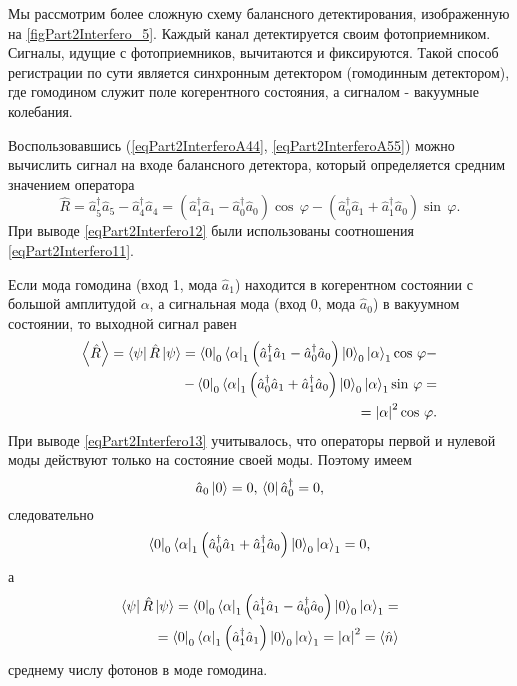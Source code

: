 

Мы рассмотрим более сложную схему балансного детектирования,
изображенную на \autoref{figPart2Interfero_5}. Каждый канал
детектируется своим фотоприемником. Сигналы, идущие с фотоприемников, 
вычитаются и фиксируются. Такой способ регистрации по сути является
синхронным детектором (гомодинным детектором), где гомодином служит
поле когерентного состояния, а сигналом - вакуумные колебания.

Воспользовавшись (\ref{eqPart2InterferoA44},
\ref{eqPart2InterferoA55}) можно вычислить
сигнал на входе балансного детектора, который определяется средним значением
оператора  
\begin{equation}
\hat{R} = 
\hat{a}_5^{\dag} \hat{a}_5 - 
\hat{a}_4^{\dag} \hat{a}_4 =
\left(
\hat{a}_1^{\dag} \hat{a}_1 - 
\hat{a}_0^{\dag} \hat{a}_0
\right) \cos\,\varphi -
\left(
\hat{a}_0^{\dag} \hat{a}_1 + 
\hat{a}_1^{\dag} \hat{a}_0
\right) \sin\,\varphi.
\label{eqPart2Interfero12}
\end{equation}
При выводе \eqref{eqPart2Interfero12} были использованы соотношения
\eqref{eqPart2Interfero11}.

Если мода гомодина (вход 1, мода $\hat{a}_1$) находится в
когерентном состоянии с большой амплитудой $\alpha$, а сигнальная мода
(вход 0, мода $\hat{a}_0$) в вакуумном состоянии, то выходной сигнал
равен
\begin{eqnarray}
\left<\hat{R}\right> = 
\left<\psi\right|\hat{R} \left|\psi\right> = 
\bra{0}_0\left<\alpha\right|_1
\left(
\hat{a}_1^{\dag} \hat{a}_1 - 
\hat{a}_0^{\dag} \hat{a}_0
\right)
\ket{0}_0\left|\alpha\right>_1
\cos\,\varphi
-
\nonumber \\
-
\bra{0}_0\left<\alpha\right|_1
\left(
\hat{a}_0^{\dag} \hat{a}_1 + 
\hat{a}_1^{\dag} \hat{a}_0
\right) 
\ket{0}_0\left|\alpha\right>_1
\sin\,\varphi = 
\nonumber \\
= \left|\alpha\right|^2 \cos\,\varphi.
\label{eqPart2Interfero13}
\end{eqnarray}
При выводе \eqref{eqPart2Interfero13} учитывалось, что операторы
первой и нулевой моды действуют только на состояние своей
моды. Поэтому имеем
\[
\hat{a}_0\ket{0} = 0, \, 
\bra{0}\hat{a}_0^{\dag} = 0,
\]
следовательно 
\[
\bra{0}_0\left<\alpha\right|_1
\left(
\hat{a}_0^{\dag} \hat{a}_1 + 
\hat{a}_1^{\dag} \hat{a}_0
\right) 
\ket{0}_0\left|\alpha\right>_1 = 0,
\]
а
\begin{eqnarray}
\left<\psi\right|\hat{R} \left|\psi\right>= 
\bra{0}_0\left<\alpha\right|_1
\left(
\hat{a}_1^{\dag} \hat{a}_1 - 
\hat{a}_0^{\dag} \hat{a}_0
\right)
\ket{0}_0\left|\alpha\right>_1
=
\nonumber \\
=
\bra{0}_0\left<\alpha\right|_1
\left(
\hat{a}_1^{\dag} \hat{a}_1
\right)
\ket{0}_0\left|\alpha\right>_1
= \left|\alpha\right|^2 = 
\left<\hat{n}\right>
\nonumber
\end{eqnarray}
среднему числу фотонов в моде гомодина.

